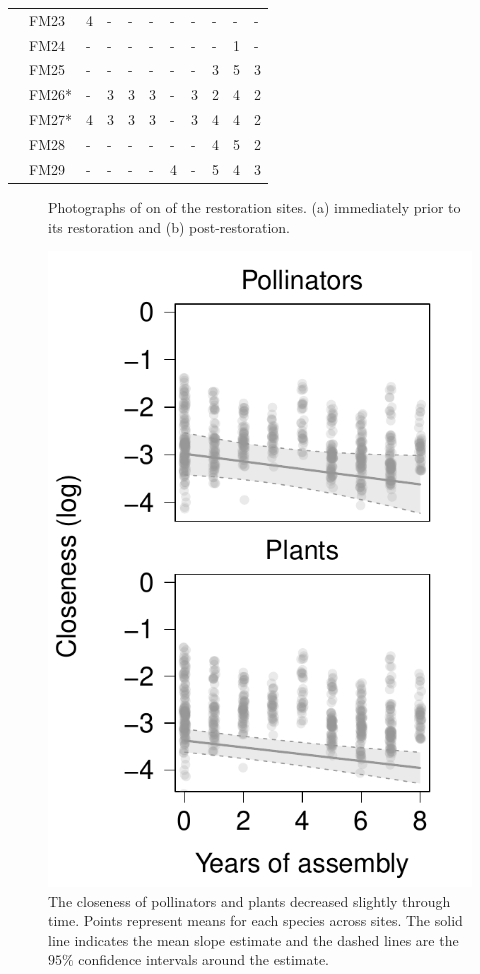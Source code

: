 \documentclass[12pt]{article}
\begin{document}
\begin{table}
\begin{tabular}{lllllllllll}
    &FM23 & 4 & - & - & - & - & - & - & - & -\\
    &FM24 & - & - & - & - & - & - & - & 1 & -\\
    &FM25 & - & - & - & - & - & - & 3 & 5 & 3\\
    &FM26* & - & 3 & 3 & 3 & - & 3 & 2 & 4 & 2\\
    &FM27* & 4 & 3 & 3 & 3 & - & 3 & 4 & 4 & 2\\
    &FM28 & - & - & - & - & - & - & 4 & 5 & 2\\
    &FM29 & - & - & - & - & 4 & - & 5 & 4 & 3\\
    \hline
  \end{tabular}
  \label{tab:controls}
\end{table}
\clearpage


\begin{figure}[!tbp]
  \centering
  \hfill
  \caption{Photographs of on of the restoration sites. (a) immediately prior to its restoration and (b) post-restoration.}
\end{figure}
\clearpage


\begin{figure}
  \centering
  \includegraphics[width=.6\textwidth]{../analysis/speciesLevel/figures/closenessPanel.pdf}
  \caption{The closeness of pollinators and plants decreased slightly
    through time. Points represent means for each species across
    sites. The solid line indicates the mean slope estimate and the
    dashed lines are the $95\%$ confidence intervals around the
    estimate.}
  \label{fig:closeness}
\end{figure}
\clearpage
\end{document}
